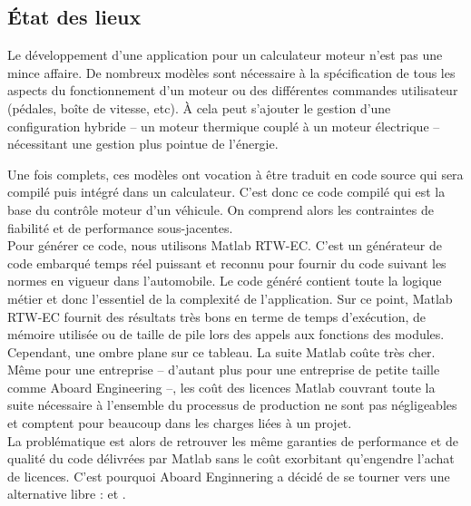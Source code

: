 \subsection{État des lieux}
\label{sec:rtw}
Le développement d'une application pour un calculateur moteur n'est pas une
mince affaire. De nombreux modèles sont nécessaire à la spécification de tous
les aspects du fonctionnement d'un moteur ou des différentes commandes
utilisateur (pédales, boîte de vitesse, etc). À cela peut s'ajouter
le gestion d'une configuration hybride -- un moteur thermique couplé à un moteur
électrique -- nécessitant une gestion plus pointue de l'énergie.

Une fois complets, ces modèles ont vocation à être traduit en code source qui
sera compilé puis intégré dans un calculateur. C'est donc ce code compilé qui
est la base du contrôle moteur d'un véhicule. On comprend alors les contraintes
de fiabilité et de performance sous-jacentes.\\

Pour générer ce code, nous utilisons Matlab\up{\circledR} RTW-EC\up{\circledR}. C'est un
générateur de code embarqué temps réel puissant et reconnu pour fournir du code
suivant les normes en vigueur dans l'automobile.
Le code généré contient toute la logique métier et donc l'essentiel de la
complexité de l'application. Sur ce point, Matlab\up{\circledR} RTW-EC\up{\circledR}
fournit des résultats très bons en terme de temps d'exécution, de mémoire
utilisée ou de taille de pile lors des appels aux fonctions des modules.\\

Cependant, une ombre plane sur ce tableau. La suite Matlab\up{\circledR} coûte
très cher. Même pour une entreprise -- d'autant plus pour une entreprise de
petite taille comme Aboard Engineering --, les coût des licences
Matlab\up{\circledR} couvrant toute la suite nécessaire à l'ensemble du
processus de production ne sont pas négligeables et comptent pour beaucoup dans les
charges liées à un projet.\\

La problématique est alors de retrouver les même garanties de performance et de
qualité du code délivrées par Matlab\up{\circledR} sans le coût exorbitant
qu'engendre l'achat de licences. C'est pourquoi Aboard Enginnering a décidé de
se tourner vers une alternative libre :  et .

